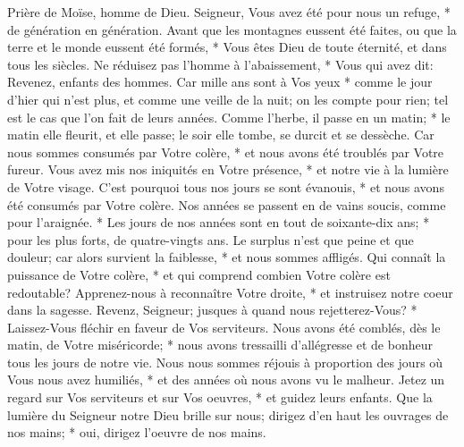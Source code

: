 Prière de Moïse, homme de Dieu. Seigneur, Vous avez été pour nous un refuge, * de génération en génération.
Avant que les montagnes eussent été faites, ou que la terre et le monde eussent été formés, * Vous êtes Dieu de toute éternité, et dans tous les siècles.
Ne réduisez pas l'homme à l'abaissement, * Vous qui avez dit: Revenez, enfants des hommes.
Car mille ans sont à Vos yeux * comme le jour d'hier qui n'est plus, et comme une veille de la nuit;
on les compte pour rien; tel est le cas que l'on fait de leurs années.
Comme l'herbe, il passe en un matin; * le matin elle fleurit, et elle passe; le soir elle tombe, se durcit et se dessèche.
Car nous sommes consumés par Votre colère, * et nous avons été troublés par Votre fureur.
Vous avez mis nos iniquités en Votre présence, * et notre vie à la lumière de Votre visage.
C'est pourquoi tous nos jours se sont évanouis, * et nous avons été consumés par Votre colère. Nos années se passent en de vains soucis, comme pour l'araignée. *
Les jours de nos années sont en tout de soixante-dix ans; * pour les plus forts, de quatre-vingts ans. Le surplus n'est que peine et que douleur; car alors survient la faiblesse, * et nous sommes affligés.
Qui connaît la puissance de Votre colère, * et qui comprend combien Votre colère est redoutable?
Apprenez-nous à reconnaître Votre droite, * et instruisez notre coeur dans la sagesse.
Revenz, Seigneur; jusques à quand nous rejetterez-Vous? * Laissez-Vous fléchir en faveur de Vos serviteurs.
Nous avons été comblés, dès le matin, de Votre miséricorde; * nous avons tressailli d'allégresse et de bonheur tous les jours de notre vie.
Nous nous sommes réjouis à proportion des jours où Vous nous avez humiliés, * et des années où nous avons vu le malheur.
Jetez un regard sur Vos serviteurs et sur Vos oeuvres, * et guidez leurs enfants.
Que la lumière du Seigneur notre Dieu brille sur nous; dirigez d'en haut les ouvrages de nos mains; * oui, dirigez l'oeuvre de nos mains.

